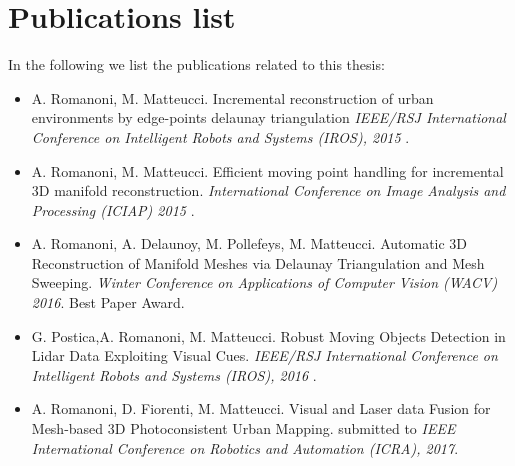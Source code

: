 \section{Publications list}
In the following we list the publications related to this thesis:
\begin{itemize}
 \item  A. Romanoni, M. Matteucci. Incremental reconstruction of urban environments by edge-points delaunay triangulation  \emph{IEEE/RSJ International Conference on Intelligent Robots and Systems (IROS), 2015} \cite{romanoni15b}.
 \item A. Romanoni, M. Matteucci. Efficient moving point handling for incremental 3D manifold reconstruction. \emph{International Conference on Image Analysis and Processing (ICIAP) 2015} \cite{romanoni15a}.
 \item A. Romanoni, A. Delaunoy, M. Pollefeys, M. Matteucci. Automatic 3D Reconstruction of Manifold Meshes via Delaunay Triangulation and Mesh Sweeping. \emph{Winter Conference on Applications of Computer Vision (WACV) 2016}. Best Paper Award. \cite{romanoni16}
 \item G. Postica,A. Romanoni, M. Matteucci. Robust Moving Objects Detection in Lidar Data Exploiting Visual Cues. \emph{IEEE/RSJ International Conference on Intelligent Robots and Systems (IROS), 2016}  \cite{postica16}.
 \item A. Romanoni, D. Fiorenti, M. Matteucci. Visual and Laser data Fusion for Mesh-based 3D Photoconsistent Urban Mapping. submitted to \emph{IEEE International Conference on Robotics and Automation (ICRA), 2017}.
\end{itemize}










